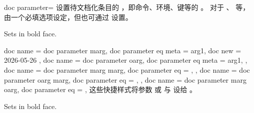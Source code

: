 \begin{docTcbKey}[][doc new={2020-04-22}]{doc parameter}{=}{\tcbdocdescInitEmpty}
  设置待文档化条目的 ，即命令、环境、键等的 。
  对于 、 等，
   由一个必填选项设定，但也可通过  设置。
\begin{dispExample}
\begin{docCommands}[
    doc no index,  %
    doc name      = textbf,
    doc parameter = \marg{text},
  ] {}
  Sets  in bold face.
\end{docCommands}
\end{dispExample}
\end{docTcbKey}


\begin{docTcbKeys}[doc description = 样式]
  {
    {
      doc name              = doc parameter marg,
      doc parameter eq meta = arg1,
      doc new  = 2026-05-26
    },
    {
      doc name              = doc parameter oarg,
      doc parameter eq meta = arg1,
    },
    {
      doc name         = doc parameter marg marg,
      doc parameter eq = ,
    },
    {
      doc name         = doc parameter oarg marg,
      doc parameter eq = ,
    },
    {
      doc name         = doc parameter marg oarg,
      doc parameter eq = ,
    }
  }
这些快捷样式将参数  或  与 
设给 。

\begin{dispExample}
\begin{docCommands}[
    doc no index,  %
    doc name           = textbf,
    doc parameter marg = text,
  ] {}
  Sets  in bold face.
\end{docCommands}
\end{dispExample}
\end{docTcbKeys}

\clearpage

